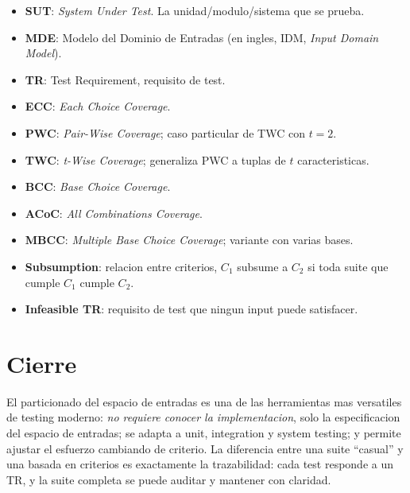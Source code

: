 \documentclass[12pt,a4paper]{article}
\begin{document}
\begin{itemize}[itemsep=0.15em]
  \item \textbf{SUT}: \textit{System Under Test}. La unidad/modulo/sistema que se prueba.
  \item \textbf{MDE}: Modelo del Dominio de Entradas (en ingles, IDM, \textit{Input Domain
  Model}).
  \item \textbf{TR}: Test Requirement, requisito de test.
  \item \textbf{ECC}: \textit{Each Choice Coverage}.
  \item \textbf{PWC}: \textit{Pair-Wise Coverage}; caso particular de TWC con \(t=2\).
  \item \textbf{TWC}: \textit{t-Wise Coverage}; generaliza PWC a tuplas de \(t\) caracteristicas.
  \item \textbf{BCC}: \textit{Base Choice Coverage}.
  \item \textbf{ACoC}: \textit{All Combinations Coverage}.
  \item \textbf{MBCC}: \textit{Multiple Base Choice Coverage}; variante con varias bases.
  \item \textbf{Subsumption}: relacion entre criterios, \(C_1\) subsume a \(C_2\) si toda suite
  que cumple \(C_1\) cumple \(C_2\).
  \item \textbf{Infeasible TR}: requisito de test que ningun input puede satisfacer.
\end{itemize}

\section*{Cierre}

El particionado del espacio de entradas es una de las herramientas mas versatiles de testing
moderno: \emph{no requiere conocer la implementacion}, solo la especificacion del espacio de
entradas; se adapta a unit, integration y system testing; y permite ajustar el esfuerzo cambiando
de criterio. La diferencia entre una suite ``casual'' y una basada en criterios es exactamente la
trazabilidad: cada test responde a un TR, y la suite completa se puede auditar y mantener con
claridad.
\end{document}
